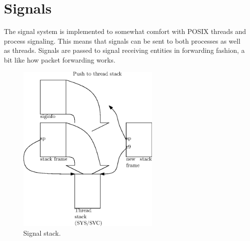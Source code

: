 \chapter{Signals}

The signal system is implemented to somewhat comfort with \acs{POSIX} threads
and process signaling. This means that signals can be sent to both processes as
well as threads. Signals are passed to signal receiving entities in forwarding
fashion, a bit like how packet forwarding works.

\begin{figure}
  \center
  \includegraphics[width=7cm]{pics/signal_stack}
  \caption{Signal stack.}
  \label{figure:sigstack}
\end{figure}
